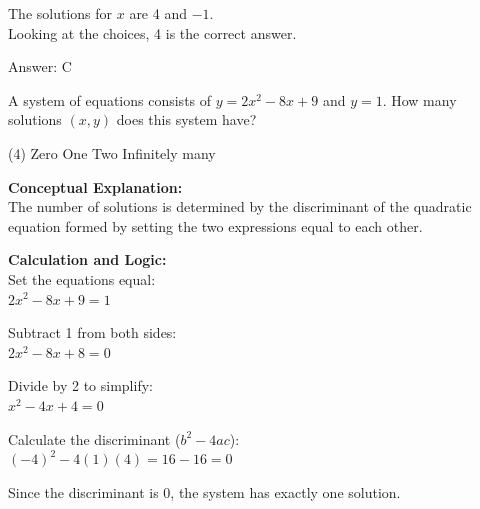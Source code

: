 \documentclass[11pt,paper=a4,answers]{exam}
\begin{document}
\begin{questions}
\begin{solution}
\vspace{10pt}

The solutions for $x$ are 4 and $-1$. \\
Looking at the choices, 4 is the correct answer.

\vspace{25pt}

Answer: \colorbox{yellow!100}{C}
\end{solution}


\question
A system of equations consists of $y = 2x^2 - 8x + 9$ and $y = 1$. How many solutions $(x, y)$ does this system have?
\begin{tasks}(4)
    \task Zero
    \task One
    \task Two
    \task Infinitely many
\end{tasks}

\begin{solution}
\textbf{Conceptual Explanation:} \\
The number of solutions is determined by the discriminant of the quadratic equation formed by setting the two expressions equal to each other.

\vspace{20pt}

\textbf{Calculation and Logic:} \\
Set the equations equal: \\
$2x^2 - 8x + 9 = 1$

\vspace{10pt}

Subtract 1 from both sides: \\
$2x^2 - 8x + 8 = 0$

\vspace{10pt}

Divide by 2 to simplify: \\
$x^2 - 4x + 4 = 0$

\vspace{10pt}

Calculate the discriminant ($b^2 - 4ac$): \\
$(-4)^2 - 4(1)(4) = 16 - 16 = 0$

\vspace{10pt}

Since the discriminant is 0, the system has exactly one solution.

\vspace{25pt}


\end{solution}
\end{questions}
\end{document}
